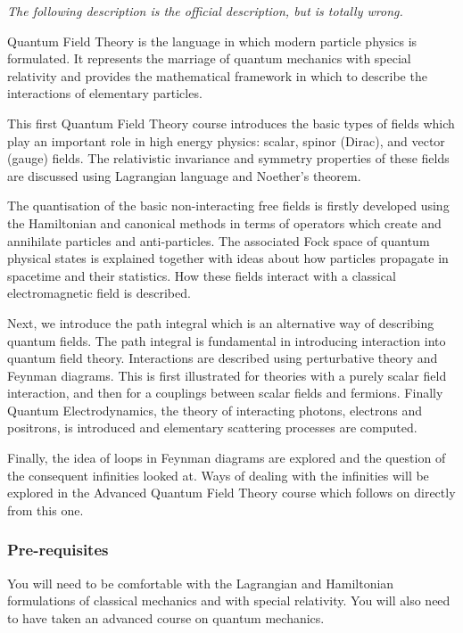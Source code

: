 \documentclass[a4paper]{article}
\begin{document}
\maketitle
{\small
\setlength{\parindent}{0em}
\setlength{\parskip}{1em}
\emph{The following description is the official description, but is totally wrong.}

Quantum Field Theory is the language in which modern particle physics is formulated. It represents the marriage of quantum mechanics with special relativity and provides the mathematical framework in which to describe the interactions of elementary particles.

This first Quantum Field Theory course introduces the basic types of fields which play an important role in high energy physics: scalar, spinor (Dirac), and vector (gauge) fields. The relativistic invariance and symmetry properties of these fields are discussed using Lagrangian language and Noether's theorem.

The quantisation of the basic non-interacting free fields is firstly developed using the Hamiltonian and canonical methods in terms of operators which create and annihilate particles and anti-particles. The associated Fock space of quantum physical states is explained together with ideas about how particles propagate in spacetime and their statistics. How these fields interact with a classical electromagnetic field is described.

Next, we introduce the path integral which is an alternative way of describing quantum fields. The path integral is fundamental in introducing interaction into quantum field theory. Interactions are described using perturbative theory and Feynman diagrams. This is first illustrated for theories with a purely scalar field interaction, and then for a couplings between scalar fields and fermions. Finally Quantum Electrodynamics, the theory of interacting photons, electrons and positrons, is introduced and elementary scattering processes are computed.

Finally, the idea of loops in Feynman diagrams are explored and the question of the consequent infinities looked at. Ways of dealing with the infinities will be explored in the Advanced Quantum Field Theory course which follows on directly from this one.

\subsubsection*{Pre-requisites}
You will need to be comfortable with the Lagrangian and Hamiltonian formulations of classical mechanics and with special relativity. You will also need to have taken an advanced course on quantum mechanics.
}
\tableofcontents
\end{document}
